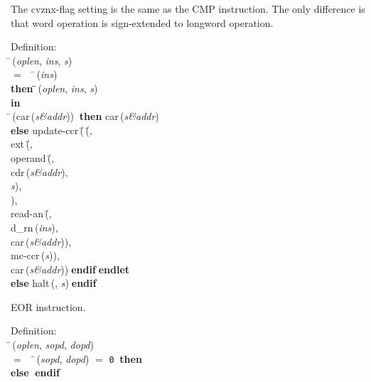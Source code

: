  The cvznx-flag setting is the same as the CMP instruction.
 The only difference is that word operation is sign-extended to longword
 operation.
\begin{tabbing}{\sc Definition}: \\  
\=\,({\it{oplen\/}}, {\it{ins\/}}, {\it{s\/}}) \\ 
$=$$\;\;\;\;$\=\,({\it{ins\/}}) \\ 
{\bf then }\=\=\,({\it{oplen\/}}, {\it{ins\/}}, {\it{s\/}})\- \\ 
{\bf in} \\ 
\=\,({\rm{car}}\,({\it{s\&addr\/}}))$\;\;${\bf then }{\rm{car}}\,({\it{s\&addr\/}}) \\ 
{\bf else }{\rm{update-ccr}}\,(\=\,(\=, \\ 
{\rm{ext}}\,(\=, \\ 
{\rm{operand}}\,(\=, \\ 
{\rm{cdr}}\,({\it{s\&addr\/}}), \\ 
{\it{s\/}})\-, \\ 
{})\-, \\ 
{\rm{read-an}}\,(\=, \\ 
{\rm{d\_rn}}\,({\it{ins\/}}), \\ 
{\rm{car}}\,({\it{s\&addr\/}}))\-, \\ 
{\rm{mc-ccr}}\,({\it{s\/}}))\-, \\ 
{\rm{car}}\,({\it{s\&addr\/}}))\-$\;${\bf  endif}\-$\;${\bf  endlet}\- \\ 
{\bf else }{\rm{halt}}\,({}, {\it{s\/}})$\;${\bf  endif}\-\-
\end{tabbing}

 EOR instruction.
\begin{tabbing}{\sc Definition}: \\  
\=\,({\it{oplen\/}}, {\it{sopd\/}}, {\it{dopd\/}}) \\ 
$=$$\;\;\;\;$\=\,({\it{sopd\/}}, {\it{dopd\/}}) $=$ {\tt{0}}$\;\;${\bf then }{} \\ 
{\bf else }{}$\;${\bf  endif}\-\-
\end{tabbing}

